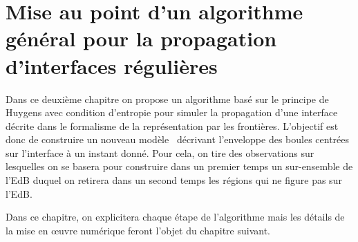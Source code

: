 \chapter[Algorithme général pour la propagation d'interfaces $\contgeom{1}$ \piecewise]{Mise au point d'un algorithme général pour la propagation d'interfaces régulières \piecewise}
\label{chap:algo_general}


Dans ce deuxième chapitre on propose un algorithme basé sur le principe de Huygens avec condition d'entropie pour simuler la propagation d'une interface décrite dans le formalisme de la représentation par les frontières. 
L'objectif est donc de construire un nouveau modèle \brep\ décrivant l'enveloppe des boules centrées sur l'interface à un instant donné.
Pour cela, on tire des observations sur lesquelles on se basera pour construire dans un premier temps un sur-ensemble de l'EdB duquel on retirera dans un second temps les régions qui ne figure pas sur l'EdB.
\par
Dans ce chapitre, on explicitera chaque étape de l'algorithme mais les détails de la mise en \oe uvre numérique feront l'objet du chapitre suivant.





